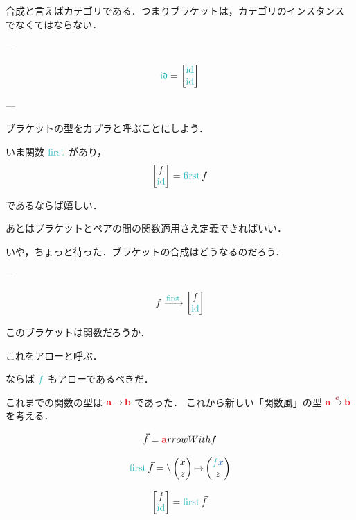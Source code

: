 \documentclass[a5paper,twoside,fleqn,draft]{jsbook}
\begin{document}
合成と言えばカテゴリである．つまりブラケットは，カテゴリのインスタンス
でなくてはならない．

---

\begin{equation}
  \mIdCat
  =
  \begin{bmatrix}
    \mId\\
    \mId
  \end{bmatrix}
\end{equation}

---

ブラケットの型をカプラと呼ぶことにしよう．

いま関数 $\mFirst$ があり，
\begin{equation}
  \begin{bmatrix}
    f\\
    \mId
  \end{bmatrix}
  =\mFirst f
\end{equation}


であるならば嬉しい．

あとはブラケットとペアの間の関数適用さえ定義できればいい．

いや，ちょっと待った．ブラケットの合成はどうなるのだろう．

---

\begin{equation}
  f
  \xrightarrow{\mFirst}
  \begin{bmatrix}
    f\\
    \mId
  \end{bmatrix}
\end{equation}

このブラケットは関数だろうか．

これをアローと呼ぶ．

ならば $\hFunc{f}$ もアローであるべきだ．

これまでの関数の型は $\hTypeName{a}\hFunctionArrow\hTypeName{b}$ であった．
これから新しい「関数風」の型 $\hTypeName{a}\mCatArrowC\hTypeName{b}$ を考える．

\begin{equation}
  \Vec{f}
  =\hTypeName{a}rrowWith{f}
\end{equation}

\begin{equation}
  \mFirst\Vec{f}
  =\mLambda{\hPairWith{x}{z}}\mLambdaArrow\hPairWith{\hFunc{f}\hVar{x}}{z}
\end{equation}

\begin{equation}
  \begin{bmatrix}
    f\\
    \mId
  \end{bmatrix}
  =\mFirst\Vec{f}
\end{equation}
\end{document}
